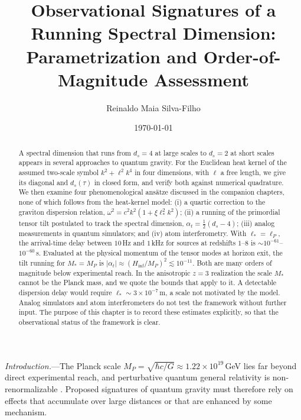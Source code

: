 \documentclass[aps,prl,reprint,twocolumn,superscriptaddress,nofootinbib,floatfix]{revtex4-2}
\begin{document}
\title{Observational Signatures of a Running Spectral Dimension:\texorpdfstring{\\}{ }Parametrization and Order-of-Magnitude Assessment}

\author{Reinaldo Maia Silva-Filho}

\date{\today}

\begin{abstract}
A spectral dimension that runs from $d_s = 4$ at large scales to $d_s = 2$ at short scales appears in several approaches to quantum gravity. For the Euclidean heat kernel of the assumed two-scale symbol $k^2 + \ell^2 k^4$ in four dimensions, with $\ell$ a free length, we give its diagonal and $d_s(\tau)$ in closed form, and verify both against numerical quadrature. We then examine four phenomenological ans\"atze discussed in the companion chapters, none of which follows from the heat-kernel model: (i) a quartic correction to the graviton dispersion relation, $\omega^2 = c^2k^2(1 + \xi\ell_\ast^2 k^2)$; (ii) a running of the primordial tensor tilt postulated to track the spectral dimension, $\alpha_t = \frac{1}{2}(d_s - 4)$; (iii) analog measurements in quantum simulators; and (iv) atom interferometry. With $\ell_\ast = \ell_P$, the arrival-time delay between $10$\,Hz and $1$\,kHz for sources at redshifts $1$--$8$ is $\sim 10^{-61}$--$10^{-60}$\,s. Evaluated at the physical momentum of the tensor modes at horizon exit, the tilt running for $M_\ast = M_P$ is $|\alpha_t| \approx (H_{\mathrm{inf}}/M_P)^2 \lesssim 10^{-11}$. Both are many orders of magnitude below experimental reach. In the anisotropic $z = 3$ realization the scale $M_\ast$ cannot be the Planck mass, and we quote the bounds that apply to it. A detectable dispersion delay would require $\ell_\ast \sim 3\times 10^{-7}$\,m, a scale not motivated by the model. Analog simulators and atom interferometers do not test the framework without further input. The purpose of this chapter is to record these estimates explicitly, so that the observational status of the framework is clear.
\end{abstract}

\maketitle

\emph{Introduction.}---The Planck scale $M_P = \sqrt{\hbar c / G} \approx 1.22 \times 10^{19}$\,GeV lies far beyond direct experimental reach, and perturbative quantum general relativity is non-renormalizable \cite{goroff1986ultraviolet}. Proposed signatures of quantum gravity must therefore rely on effects that accumulate over large distances or that are enhanced by some mechanism.
\end{document}
